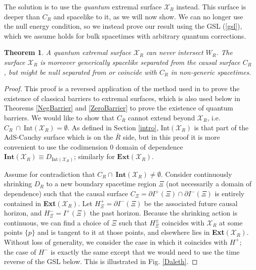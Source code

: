 \documentclass[12pt]{article}
\newtheorem{thm}{Theorem}[section]
\theoremstyle{remark}
\numberwithin{equation}{section}
\numberwithin{equation}{section}
\begin{document}
The solution is to use the \emph{quantum} extremal surface $\mathcal{X}_{R}$ instead.  This surface is deeper than $C_R$ and spacelike to it, as we will now show.  We can no longer use the null energy condition, so we instead prove our result using the GSL (\ref{gsl}), which we assume holds for bulk spacetimes with arbitrary quantum corrections.

\begin{thm} A quantum extremal surface $\mathcal{X}_{R}$ can never intersect $W_R$. 
The surface $\mathcal{X}_{R}$ is moreover generically spacelike separated from the causal surface $C_{R}$, but might be null separated from or coincide with $C_R$ in non-generic spacetimes.
\label{causal}\end{thm}
\begin{proof}
\noindent This proof is a reversed application of the method used in \cite{EngelhardtWall} to prove the existence of classical barriers to extremal surfaces, which is also used below in Theorems  \ref{NegBarrier} and \ref{ZeroBarrier} to prove the existence of quantum barriers. We would like to show that  $C_R$ cannot extend beyond $\mathcal{X}_{R}$, i.e. $C_R\ \cap \ \text{Int}\left(\mathcal{X}_{R}\right)=\emptyset$.  As defined in Section \ref{intro}, Int$\left(\mathcal{X}_{R}\right)$ is that part of the AdS-Cauchy surface which is on the $\bar{R}$ side, but in this proof it is more convenient to use the codimension 0 domain of dependence $\mathbf{Int}(\mathcal{X}_{R}) \equiv D_{\mathrm{Int}\left(\mathcal{X}_{R}\right)}$; similarly for $\mathbf{Ext}(\mathcal{X}_{R})$.

Assume for contradiction that $C_{R}\cap \  \textbf{Int}(\mathcal{X}_{R})\neq \emptyset$.  Consider continuously shrinking $D_R$ to a new boundary spacetime region $\Xi$ (not necessarily a domain of dependence) such that the causal surface $C_\Xi = \partial I^+(\Xi) \cap \partial I^-(\Xi)$ is entirely contained in \textbf{Ext}$(\mathcal{X}_{R})$.  Let $H^+_\Xi = \partial I^-(\Xi)$ be the associated future causal horizon, and $H^-_\Xi = I^+(\Xi)$ the past horizon.  Because the shrinking action is continuous, we can find a choice of $\Xi$ such that $H^\pm_\Xi$ coincides with $\mathcal{X}_{R}$ at some points $\{p\}$ and is tangent to it at those points, and elsewhere lies in \textbf{Ext}$(\mathcal{X}_{R})$.  Without loss of generality, we consider the case in which it coincides with $H^+$; the case of $H^-$ is exactly the same except that we would need to use the time reverse of the GSL below.  This is illustrated in Fig. \ref{Daleth}.


\end{proof}
\end{document}
